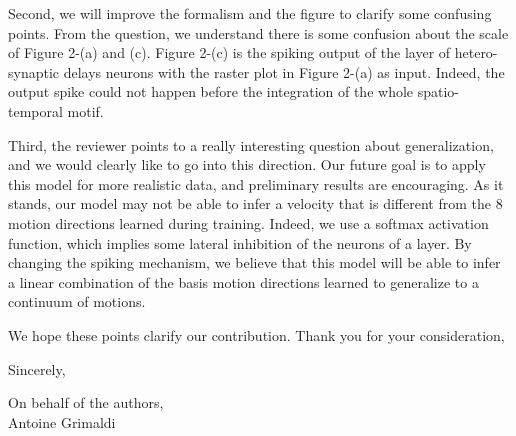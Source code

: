 \documentclass[9pt]{article}
\newcommand{\AuthorAG}{Antoine Grimaldi}
\begin{document}
Second, we will improve the formalism and the figure to clarify some confusing points. From the question, we understand there is some confusion about the scale of Figure 2-(a) and (c). Figure 2-(c) is the spiking output of the layer of hetero-synaptic delays neurons with the raster plot in Figure 2-(a) as input. Indeed, the output spike could not happen before the integration of the whole spatio-temporal motif. 

Third, the reviewer points to a really interesting question about generalization, and we would clearly like to go into this direction. Our future goal is to apply this model for more realistic data, and preliminary results are encouraging. As it stands, our model may not be able to infer a velocity that is different from the 8 motion directions learned during training. Indeed, we use a softmax activation function, which implies some lateral inhibition of the neurons of a layer. By changing the spiking mechanism, we believe that this model will be able to infer a linear combination of the basis motion directions learned to generalize to a continuum of motions. 

We hope these points clarify our contribution. Thank you for your consideration,
\vspace{\baselineskip}

Sincerely,

\vspace{2\baselineskip}

On behalf of the authors, \\
\AuthorAG

\vspace{.5\baselineskip}
\begingroup
\renewcommand{\section}[2]{}%
\endgroup
\end{document}
